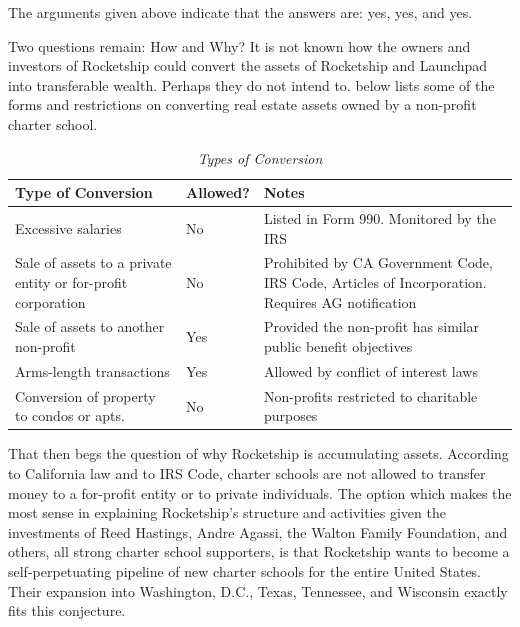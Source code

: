 The arguments given above indicate that the answers are: yes, yes, and yes.

Two questions remain: How and Why? It is not known how the owners and investors of Rocketship could convert the assets of Rocketship and Launchpad into transferable wealth. Perhaps they do not intend to.  below lists some of the forms and restrictions on converting real estate assets owned by a non-profit charter school.

\noindent%
\begin{table}[ht]
  \caption[Types of Conversion]{\textit{Types of Conversion}}%
  \label{tab:types_conversion}
  \begin{tabulary}{\textwidth}{LLL}
    \toprule
    \textbf{Type of Conversion} & \mbox{\textbf{Allowed?}} & \textbf{Notes} \\
    \midrule
    Excessive salaries & No & Listed in Form 990. Monitored by the IRS \vspace{6pt} \\
    Sale of assets to a private entity or for-profit corporation & No & Prohibited by CA Government Code, IRS Code, Articles of Incorporation. Requires AG notification \vspace{6pt} \\
    Sale of assets to another non-profit & Yes & Provided the non-profit has similar public benefit objectives \vspace{6pt} \\
    Arms-length transactions & Yes & Allowed by conflict of interest laws \vspace{6pt} \\
    Conversion of property to condos or apts. & No & Non-profits restricted to charitable purposes \\
    \bottomrule
  \end{tabulary}
\end{table}

That then begs the question of why Rocketship is accumulating assets. According to California law and to IRS Code, charter schools are not allowed to transfer money to a for-profit entity or to private individuals. The option which makes the most sense in explaining Rocketship's structure and activities given the investments of Reed Hastings, Andre Agassi, the Walton Family Foundation, and others, all strong charter school supporters, is that Rocketship wants to become a self-perpetuating pipeline of new charter schools for the entire United States. Their expansion into Washington, D.C., Texas, Tennessee, and Wisconsin exactly fits this conjecture.

